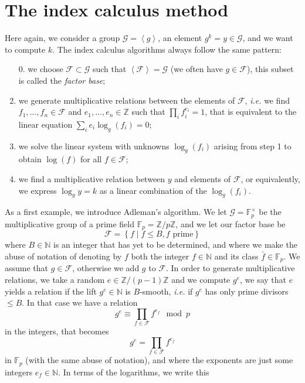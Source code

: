 \documentclass[a4paper,11pt]{article}
\theoremstyle{break}
\theoremstyle{sc}
\theoremstyle{definition}
\theoremstyle{remark}
\newcommand{\ie}{\emph{i.e. }}
\begin{document}
\section{The index calculus method}
\label{index-calculus}

Here again, we consider a group $\mathcal G=\left\langle g \right\rangle$, an element
$g^k = y\in \mathcal G$, and we want to compute $k$. The index calculus algorithms always
follow the same pattern:
\begin{enumerate}
  \item[0.] we choose $\mathcal F\subset \mathcal G$ such that $\left\langle
    \mathcal F \right\rangle = \mathcal G$
    (we often have $g\in \mathcal F$), this subset is called the \emph{factor base};
  \item we generate multiplicative relations between the elements of $\mathcal F$, \ie we
    find $f_1, \dots, f_n \in \mathcal F$ and $e_1, \dots, e_n\in \mathbb{Z}$ such that
    $\prod_i f_i^{e_i} = 1$, that is equivalent to the linear equation $\sum_i
    e_i\log_g(f_i) = 0$;
  \item we solve the linear system with unknowns $\log_g(f_i)$ arising from step
    1 to obtain $\log(f)$ for all $f\in \mathcal F$;
  \item we find a multiplicative relation between $y$ and elements of $\mathcal F$, or
    equivalently, we express $\log_g y = k$ as a linear combination of the
  $\log_g(f_i)$.
\end{enumerate}
As a first example, we introduce Adleman's algorithm. We let $\mathcal
G=\mathbb{F}_p^\times$ be the multiplicative group of a prime field
$\mathbb{F}_p=\mathbb{Z}/p\mathbb{Z}$, and we let our factor base be 
\[
  \mathcal F =\left\{ f\;|\;f\leq B, f\text{ prime} \right\}
\]
where $B\in \mathbb{N}$ is an integer that has yet to be determined, and where
we make the abuse of notation of denoting by $f$ both the integer
$f\in\mathbb{N}$ and its class $\bar f\in\mathbb{F}_p$. We assume that
$g\in\mathcal F$, otherwise we add $g$ to $\mathcal F$. In order to generate
multiplicative relations, we take a random $e\in\mathbb{Z}/(p-1)\mathbb{Z}$ and
we compute $g^e$, we say that $e$ yields a relation if the lift
$g^e\in\mathbb{N}$ is $B$-smooth, \ie if $g^e$ has only prime divisors $\leq B$.
In that case we have a relation 
\[ 
  g^e \equiv \prod_{f\in \mathcal F}f^{e_f} \mod p
\]
in the integers, that becomes 
\[ 
  g^e = \prod_{f\in \mathcal F}f^{e_f}
\]
in $\mathbb{F}_p$ (with the same abuse of notation), and where the exponents are
just some integers $e_f\in\mathbb{N}$. In terms of the logarithms, we write this
\end{document}
